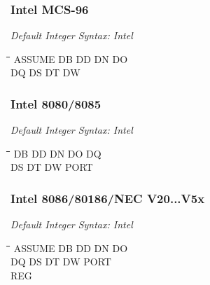 \subsubsection{Intel MCS-96}

{\em Default Integer Syntax: Intel}

{\tt\begin{tabbing}
\hspace{3cm}\=\hspace{3cm}\=\hspace{3cm}\=\hspace{3cm}\=\kill
ASSUME     \> DB          \> DD          \> DN          \> DO \\
DQ         \> DS          \> DT          \> DW \\
\end{tabbing}}
 
\subsubsection{Intel 8080/8085}

{\em Default Integer Syntax: Intel}

{\tt\begin{tabbing}
\hspace{3cm}\=\hspace{3cm}\=\hspace{3cm}\=\hspace{3cm}\=\kill
DB         \> DD          \> DN          \> DO          \> DQ \\
DS         \> DT          \> DW          \> PORT \\
\end{tabbing}}

\subsubsection{Intel 8086/80186/NEC V20...V5x}

{\em Default Integer Syntax: Intel}

{\tt\begin{tabbing}
\hspace{3cm}\=\hspace{3cm}\=\hspace{3cm}\=\hspace{3cm}\=\kill
ASSUME     \> DB          \> DD          \> DN          \> DO \\
DQ         \> DS          \> DT          \> DW          \> PORT \\
REG \\
\end{tabbing}}

